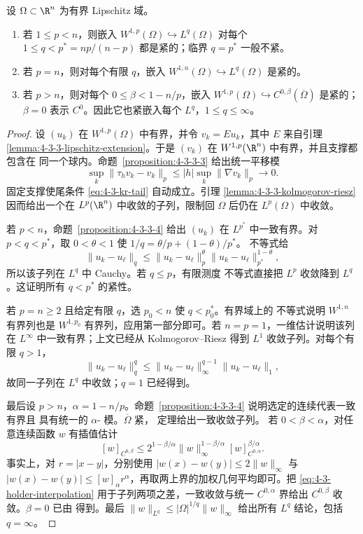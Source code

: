 \begin{theorem}\label{theorem:4-3-3-4}
设 $\Omega\subset\R^n$ 为有界 Lipschitz 域。
\begin{enumerate}
  \item 若 $1\leq p<n$，则嵌入
  $W^{1,p}(\Omega)\hookrightarrow L^q(\Omega)$ 对每个
  $1\leq q<p^*=np/(n-p)$ 都是紧的；临界 $q=p^*$ 一般不紧。
  \item 若 $p=n$，则对每个有限 $q$，嵌入
  $W^{1,n}(\Omega)\hookrightarrow L^q(\Omega)$ 是紧的。
  \item 若 $p>n$，则对每个 $0\leq\beta<1-n/p$，嵌入
  $W^{1,p}(\Omega)\hookrightarrow C^{0,\beta}(\overline\Omega)$ 是紧的；
  $\beta=0$ 表示 $C^0$。因此它也紧嵌入每个 $L^q$，$1\leq q\leq\infty$。
\end{enumerate}
\end{theorem}

\begin{proof}
设 $(u_k)$ 在 $W^{1,p}(\Omega)$ 中有界，并令 $v_k=Eu_k$，其中 $E$ 来自引理
\ref{lemma:4-3-3-lipschitz-extension}。于是 $(v_k)$ 在 $W^{1,p}(\R^n)$ 中有界，并且支撑都包含在
同一个球内。命题~\ref{proposition:4-3-3-3} 给出统一平移模
\[
 \sup_k\|\tau_hv_k-v_k\|_p
 \leq |h|\sup_k\|\nabla v_k\|_p\longrightarrow0.
\]
固定支撑使尾条件 \eqref{eq:4-3-kr-tail} 自动成立。引理
\ref{lemma:4-3-3-kolmogorov-riesz} 因而给出一个在 $L^p(\R^n)$ 中收敛的子列，限制回
$\Omega$ 后仍在 $L^p(\Omega)$ 中收敛。

若 $p<n$，命题~\ref{proposition:4-3-3-4} 给出 $(u_k)$ 在 $L^{p^*}$ 中一致有界。对
$p<q<p^*$，取 $0<\theta<1$ 使
$1/q=\theta/p+(1-\theta)/p^*$。\Holder{} 不等式给
\[
 \|u_k-u_\ell\|_q
 \leq\|u_k-u_\ell\|_p^\theta
       \|u_k-u_\ell\|_{p^*}^{1-\theta},
\]
所以该子列在 $L^q$ 中 Cauchy。若 $q\leq p$，有限测度 \Holder{} 不等式直接把 $L^p$ 收敛降到
$L^q$。这证明所有 $q<p^*$ 的紧性。

若 $p=n\geq2$ 且给定有限 $q$，选 $p_0<n$ 使 $q<p_0^*$。有界域上的 \Holder{} 不等式说明
$W^{1,n}$ 有界列也是 $W^{1,p_0}$ 有界列，应用第一部分即可。若 $n=p=1$，一维估计说明该列在
$L^\infty$ 中一致有界；上文已经从 Kolmogorov--Riesz 得到 $L^1$ 收敛子列。对每个有限
$q>1$，
\[
 \|u_k-u_\ell\|_q^q
 \leq\|u_k-u_\ell\|_\infty^{q-1}\|u_k-u_\ell\|_1,
\]
故同一子列在 $L^q$ 中收敛；$q=1$ 已经得到。

最后设 $p>n$，$\alpha=1-n/p$。命题~\ref{proposition:4-3-3-4} 说明选定的连续代表一致有界且
具有统一的 $\alpha$-\Holder{} 模。$\overline\Omega$ 紧，\ArzelaAscoli{} 定理给出一致收敛子列。
若 $0<\beta<\alpha$，对任意连续函数 $w$ 有插值估计
\[
 [w]_{C^{0,\beta}}
 \leq 2^{1-\beta/\alpha}
      \|w\|_\infty^{1-\beta/\alpha}
      [w]_{C^{0,\alpha}}^{\beta/\alpha}.
 \tag{4.3.26}\label{eq:4-3-holder-interpolation}
\]
事实上，对 $r=|x-y|$，分别使用
$|w(x)-w(y)|\leq2\|w\|_\infty$ 与
$|w(x)-w(y)|\leq[w]_\alpha r^\alpha$，再取两上界的加权几何平均即可。把
\eqref{eq:4-3-holder-interpolation} 用于子列两项之差，一致收敛与统一 $C^{0,\alpha}$ 界给出
$C^{0,\beta}$ 收敛。$\beta=0$ 已由 \ArzelaAscoli{} 得到。最后
$\|w\|_{L^q}\leq|\Omega|^{1/q}\|w\|_\infty$ 给出所有 $L^q$ 结论，包括 $q=\infty$。
\end{proof}

